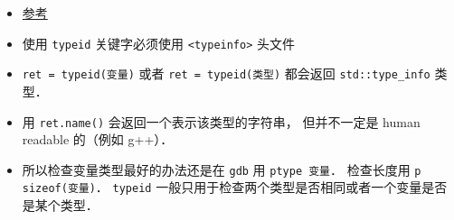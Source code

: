 
\begin{issues}
\issueDraft
\end{issues}

\begin{itemize}
\item \href{https://en.cppreference.com/w/cpp/language/typeid}{参考}
\item 使用 \verb|typeid| 关键字必须使用 \verb|<typeinfo>| 头文件
\item \verb|ret = typeid(变量)| 或者 \verb|ret = typeid(类型)| 都会返回 \verb|std::type_info| 类型．
\item 用 \verb|ret.name()| 会返回一个表示该类型的字符串， 但并不一定是 human readable 的（例如 g++）．
\item 所以检查变量类型最好的办法还是在 \verb|gdb| 用 \verb|ptype 变量|． 检查长度用 \verb|p sizeof(变量)|． \verb|typeid| 一般只用于检查两个类型是否相同或者一个变量是否是某个类型．
\end{itemize}
